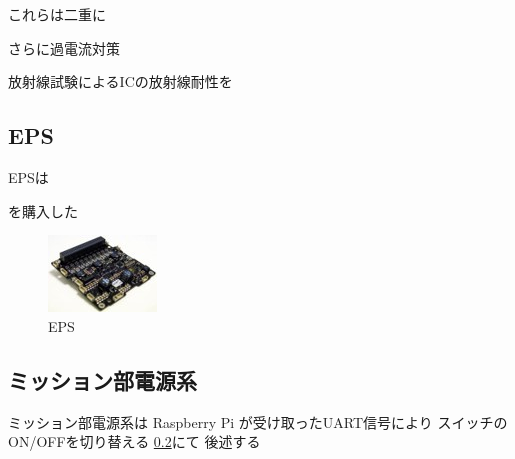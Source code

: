 これらは二重に

さらに過電流対策

放射線試験によるICの放射線耐性を




\subsection{EPS}
EPSは

を購入した
\begin{figure}[htbp]
	\begin{center}
		\includegraphics[width=0.5\linewidth]{./03/fig/eps.jpg}
		\caption{EPS}
		\label{eps}
	\end{center}
\end{figure}

\subsection{ミッション部電源系}
ミッション部電源系は
Raspberry Pi
が受け取ったUART信号により
スイッチのON/OFFを切り替える
\ref{}にて
後述する


